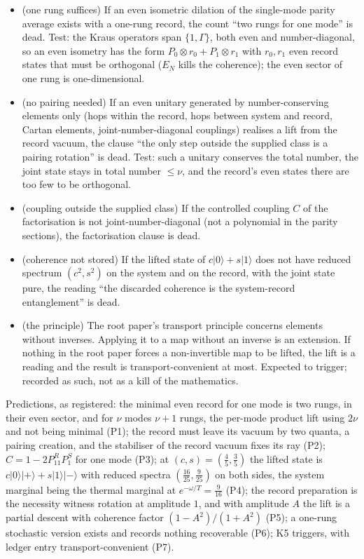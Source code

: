 \documentclass[11pt]{article}
\theoremstyle{definition}
\theoremstyle{plain}
\providecommand{\EN}{}\renewcommand{\EN}{E_{N}}
\providecommand{\G}{}\renewcommand{\G}{\Gamma}
\providecommand{\ket}{}\renewcommand{\ket}[1]{|#1\rangle}
\begin{document}
\begin{itemize}
\item[K1] (one rung suffices) If an even isometric dilation of the single-mode parity average exists with a one-rung record, the count ``two rungs for one mode'' is dead. Test: the Kraus operators span $\{1, \G\}$, both even and number-diagonal, so an even isometry has the form $P_{0} \otimes r_{0} + P_{1} \otimes r_{1}$ with $r_{0}, r_{1}$ even record states that must be orthogonal ($\EN$ kills the coherence); the even sector of one rung is one-dimensional.
\item[K2] (no pairing needed) If an even unitary generated by number-conserving elements only (hops within the record, hops between system and record, Cartan elements, joint-number-diagonal couplings) realises a lift from the record vacuum, the clause ``the only step outside the supplied class is a pairing rotation'' is dead. Test: such a unitary conserves the total number, the joint state stays in total number $\leq \nu$, and the record's even states there are too few to be orthogonal.
\item[K3] (coupling outside the supplied class) If the controlled coupling $C$ of the factorisation is not joint-number-diagonal (not a polynomial in the parity sections), the factorisation clause is dead.
\item[K4] (coherence not stored) If the lifted state of $c\ket{0} + s\ket{1}$ does not have reduced spectrum $(c^{2}, s^{2})$ on the system and on the record, with the joint state pure, the reading ``the discarded coherence is the system-record entanglement'' is dead.
\item[K5] (the principle) The root paper's transport principle concerns elements without inverses. Applying it to a map without an inverse is an extension. If nothing in the root paper forces a non-invertible map to be lifted, the lift is a reading and the result is transport-convenient at most. Expected to trigger; recorded as such, not as a kill of the mathematics.
\end{itemize}
Predictions, as registered: the minimal even record for one mode is two rungs, in their even sector, and for $\nu$ modes $\nu + 1$ rungs, the per-mode product lift using $2\nu$ and not being minimal (P1); the record must leave its vacuum by two quanta, a pairing creation, and the stabiliser of the record vacuum fixes its ray (P2); $C = 1 - 2P^{R}_{11}P^{S}_{1}$ for one mode (P3); at $(c, s) = (\tfrac45, \tfrac35)$ the lifted state is $c\ket{0}\ket{+} + s\ket{1}\ket{-}$ with reduced spectra $(\tfrac{16}{25}, \tfrac{9}{25})$ on both sides, the system marginal being the thermal marginal at $e^{-\omega/T} = \tfrac{9}{16}$ (P4); the record preparation is the necessity witness rotation at amplitude $1$, and with amplitude $A$ the lift is a partial descent with coherence factor $(1 - A^{2})/(1 + A^{2})$ (P5); a one-rung stochastic version exists and records nothing recoverable (P6); K5 triggers, with ledger entry transport-convenient (P7).
\end{document}
